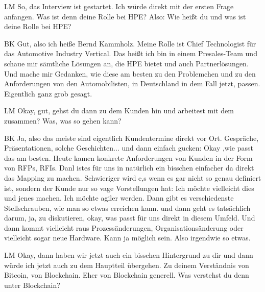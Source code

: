 \begin{xlist}
    
    \item[LM] So, das Interview ist gestartet. Ich würde direkt mit der ersten Frage anfangen. Was ist denn deine Rolle bei HPE?  Also: Wie heißt du und was ist deine Rolle bei HPE?
    \item[BK] Gut, also ich heiße Bernd Kammholz. Meine Rolle ist Chief Technologist für das Automotive Industry Vertical. Das heißt ich bin in einem Presales-Team und schaue mir sämtliche Lösungen an, die HPE bietet und auch Partnerlösungen. Und mache mir Gedanken, wie diese am besten zu den Problemchen und zu den Anforderungen von den Automobilisten, in Deutschland in dem Fall jetzt, passen. Eigentlich ganz grob gesagt.
    \item[LM] Okay, gut, gehst du dann zu dem Kunden hin und arbeitest mit dem zusammen? Was, was so gehen kann?
    \item[BK] Ja, also das meiste sind eigentlich Kundentermine direkt vor Ort. Gespräche, Präsentationen, solche Geschichten... und dann einfach gucken: Okay ,wie passt das am besten. Heute kamen konkrete Anforderungen von Kunden in der Form von RFPs, RFIs. Danl istes für uns in natürlich ein bisschen einfacher da direkt das Mapping zu machen. Schwieriger wird e,s wenn es gar nicht so genau definiert ist, sondern der Kunde nur so vage Vorstellungen hat: Ich möchte vielleicht dies und jenes machen. Ich möchte agiler werden. Dann gibt es verschiedenste Stellschrauben, wie man so etwas erreichen kann. und dann geht es tatsächlich darum, ja, zu diskutieren, okay, was passt für uns direkt in diesem Umfeld. Und dann kommt vielleicht raus Prozessänderungen, Organisationsänderung oder vielleicht sogar neue Hardware. Kann ja möglich sein. Also irgendwie so etwas.
    \item[LM] Okay, dann haben wir jetzt auch ein bisschen Hintergrund zu dir und dann würde ich jetzt auch zu dem Hauptteil übergehen. Zu deinem Verständnis von Bitcoin, von Blockchain. Eher von Blockchain generell. Was verstehst du denn unter Blockchain? 

\end{xlist}
